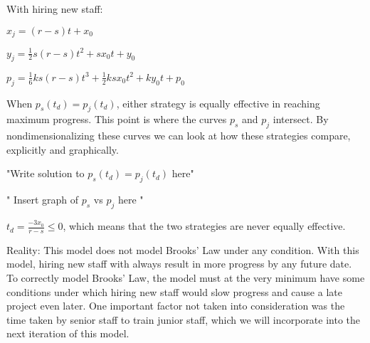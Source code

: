 \documentclass{article}
\newenvironment{atomize}
    {\begin{list} {} {
            \setlength\itemindent{0pt}
            \setlength\leftmargin{10pt}
            \setlength\labelwidth{0pt}
    }}
    {\end{list}}
\begin{document}
\begin{atomize}
\begin{atomize}
\begin{itemize}
				  \item With hiring new staff:
				    \begin{atomize}
				    \item $x_{j} = \left(r - s\right)t + x_{0}$
						\item $y_{j} = \frac{1}{2}s\left(r - s\right)t^{2} + sx_{0}t +
						y_{0}$
						\item $p_{j} = \frac{1}{6}ks(r-s)t^{3} + \frac{1}{2}ksx_{0}t^{2} +
						ky_{0}t + p_{0}$
				    \end{atomize}
				  \item When $p_{s}(t_{d})=p_{j}(t_{d})$, either strategy is equally
						effective in reaching maximum progress. This point is where the
						curves $p_{s}$ and $p_{j}$ intersect. By nondimensionalizing these
						curves we can look at how these strategies compare, explicitly and
						graphically.\newline

						\begin{atomize}
							\item "Write solution to $p_{s}(t_{d})=p_{j}(t_{d})$ here" 
							\item " Insert graph of $p_{s}$ vs $p_{j}$ here "\newline
						\end{atomize}
						$t_{d} = \frac{-3x_{0}}{r-s} \leq 0$, which means that the two
						strategies are never equally effective.
				  	\end{itemize}	
				\item Reality:
					This model does not model Brooks' Law under any condition. With this
					model, hiring new staff with always result in more progress by any
					future date. To correctly model Brooks' Law, the model must at the
					very minimum have some conditions under which hiring new staff would
					slow progress and cause a late project even later. One important
					factor not taken into consideration was the time taken by senior staff
					to train junior staff, which we will incorporate into the next
					iteration of this model.
  	\end{atomize}
  \end{atomize}
\end{document}
